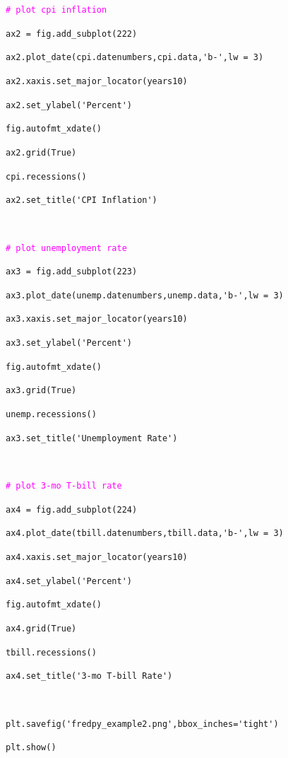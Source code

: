 \documentclass[11pt,fleqn]{article}
\newcommand{\ttt}{\texttt}
\newcommand{\tc}{\textcolor}
\begin{document}
\begin{minipage}{6.5in}
\ttt{\tc{Magenta}{\# plot cpi inflation}}

\verb!ax2 = fig.add_subplot(222)!

\verb!ax2.plot_date(cpi.datenumbers,cpi.data,'b-',lw = 3)!

\verb!ax2.xaxis.set_major_locator(years10)!

\verb!ax2.set_ylabel('Percent')!

\verb!fig.autofmt_xdate()!

\ttt{ax2.grid(True)}

\ttt{cpi.recessions()}

\verb!ax2.set_title('CPI Inflation')!

\

\end{minipage}

\begin{minipage}{6.5in}
\ttt{\tc{Magenta}{\# plot unemployment rate}}

\verb!ax3 = fig.add_subplot(223)!

\verb!ax3.plot_date(unemp.datenumbers,unemp.data,'b-',lw = 3)!

\verb!ax3.xaxis.set_major_locator(years10)!

\verb!ax3.set_ylabel('Percent')!

\verb!fig.autofmt_xdate()! 

\ttt{ax3.grid(True)}

\ttt{unemp.recessions()}

\verb!ax3.set_title('Unemployment Rate')!

\

\end{minipage}

\begin{minipage}{6.5in}
\ttt{\tc{Magenta}{\# plot 3-mo T-bill rate}}

\verb!ax4 = fig.add_subplot(224)!

\verb!ax4.plot_date(tbill.datenumbers,tbill.data,'b-',lw = 3)!

\verb!ax4.xaxis.set_major_locator(years10)!

\verb!ax4.set_ylabel('Percent')!

\verb!fig.autofmt_xdate()!

\ttt{ax4.grid(True)}

\ttt{tbill.recessions()}

\verb!ax4.set_title('3-mo T-bill Rate')!

\

\verb!plt.savefig('fredpy_example2.png',bbox_inches='tight')!

\ttt{plt.show()}

\

\end{minipage}
\end{document}

